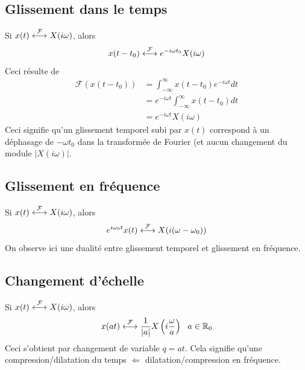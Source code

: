 	\subsection{Glissement dans le temps}
	Si $x(t) \ft X(i\omega)$, alors 
	\begin{equation}
	x(t-t_0) \ft e^{-i\omega t_0}X(i\omega)
	\end{equation}
	Ceci résulte de 
	\begin{equation}
	\begin{array}{ll}
	\mathcal{F}(x(t-t_0)) &= \int_{-\infty}^\infty x(t-t_0)e^{-i\omega t}dt\\
	&= e^{-i\omega t} \int_{-\infty}^\infty x(t-t_0)dt \\
	&= e^{-i\omega t}X(i\omega)
	\end{array}
	\end{equation}
	Ceci signifie qu'un glissement temporel subi par $x(t)$ correspond à un 
	déphasage de $-\omega t_0$ dans la transformée de Fourier (et aucun 
	changement du module $|X(i\omega)|$.
	
	\subsection{Glissement en fréquence}
	Si $x(t) \ft X(i\omega)$, alors 
	\begin{equation}
	e^{i\omega_0t}x(t) \ft X(i(\omega-\omega_0))
	\end{equation}
	On observe ici une dualité entre glissement temporel et glissement 
	en fréquence.\\
	
	
	\subsection{Changement d'échelle}
	Si $x(t) \ft X(i\omega)$, alors 
	\begin{equation}
	x(at) \ft \frac{1}{|a|}X\left(i\frac{\omega}{a}\right)\ \ a\in\mathbb{R}
	_0
	\end{equation}
	Ceci s'obtient par changement de variable $q=at$. Cela signifie qu'une 
	compression/dilatation du temps $\Leftarrow$ dilatation/compression 
	en fréquence.

